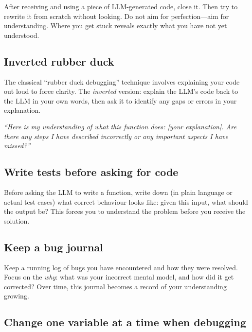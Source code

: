 \documentclass[12pt]{article}
\newcommand{\oq}{``}
\newcommand{\cq}{''}
\begin{document}
After receiving and using a piece of LLM-generated code, close it. Then try to rewrite it from scratch without looking. Do not aim for perfection---aim for understanding.
Where you get stuck reveals exactly what you have not yet understood.

\subsection{Inverted rubber duck}

The classical \oq rubber duck debugging\cq{} technique involves explaining your code out loud to force clarity.
The \emph{inverted} version: explain the LLM's code back to the LLM in your own words, then ask it to identify any gaps or errors in your explanation.

\begin{tcolorbox}[
    colback=blue!5,
    colframe=blue!40!black,
    boxrule=1pt,
    leftrule=4pt,
    arc=2pt,
    colbacktitle=blue!40!black,
    title={\textbf{Example prompt}},
    fonttitle=\bfseries\color{white}
]
\emph{``Here is my understanding of what this function does: [your explanation]. Are there any steps I have described incorrectly or any important aspects I have missed?''}
\end{tcolorbox}

\subsection{Write tests before asking for code}

Before asking the LLM to write a function, write down (in plain language or actual test cases) what correct behaviour looks like: given this input, what should the output be?
This forces you to understand the problem before you receive the solution.

\subsection{Keep a bug journal}

Keep a running log of bugs you have encountered and how they were resolved. Focus on the \emph{why}: what was your incorrect mental model, and how did it get corrected?
Over time, this journal becomes a record of your understanding growing.

\subsection{Change one variable at a time when debugging}
\end{document}
